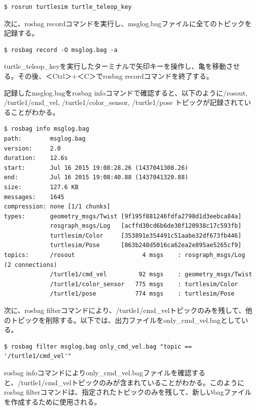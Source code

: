 \begin{lstlisting}[language=ROS]
$ rosrun turtlesim turtle_teleop_key
\end{lstlisting}

次に、rosbag recordコマンドを実行し、msglog.bagファイルに全てのトピックを記録する。

\begin{lstlisting}[language=ROS]
$ rosbag record -O msglog.bag -a
\end{lstlisting}

turtle\_teleop\_keyを実行したターミナルで矢印キーを操作し、亀を移動させる。その後、＜Ctrl＞+＜C＞でrosbag recordコマンドを終了する。

記録したmsglog.bagをrosbag infoコマンドで確認すると、以下のように/rosout, /turtle1/cmd\_vel, /turtle1/color\_sensor, /turtle1/pose トピックが記録されていることがわかる。

\begin{lstlisting}[language=ROS]
$ rosbag info msglog.bag
path:        msglog.bag
version:     2.0
duration:    12.6s
start:       Jul 16 2015 19:08:28.26 (1437041308.26)
end:         Jul 16 2015 19:08:40.88 (1437041320.88)
size:        127.6 KB
messages:    1645
compression: none [1/1 chunks]
types:       geometry_msgs/Twist [9f195f881246fdfa2798d1d3eebca84a]
             rosgraph_msgs/Log   [acffd30cd6b6de30f120938c17c593fb]
             turtlesim/Color     [353891e354491c51aabe32df673fb446]
             turtlesim/Pose      [863b248d5016ca62ea2e895ae5265cf9]
topics:      /rosout                   4 msgs    : rosgraph_msgs/Log   (2 connections)
             /turtle1/cmd_vel         92 msgs    : geometry_msgs/Twist
             /turtle1/color_sensor   775 msgs    : turtlesim/Color
             /turtle1/pose           774 msgs    : turtlesim/Pose
\end{lstlisting}

次に、rosbag filterコマンドにより、/turtle1/cmd\_velトピックのみを残して、他のトピックを削除する。以下では、出力ファイルをonly\_cmd\_vel.bagとしている。

\begin{lstlisting}[language=ROS]
$ rosbag filter msglog.bag only_cmd_vel.bag "topic == '/turtle1/cmd_vel'"
\end{lstlisting}

rosbag infoコマンドによりonly\_cmd\_vel.bagファイルを確認すると、/turtle1/cmd\_velトピックのみが含まれていることがわかる。このようにrosbag filterコマンドは、指定されたトピックのみを残して、新しいbagファイルを作成するために使用される。

